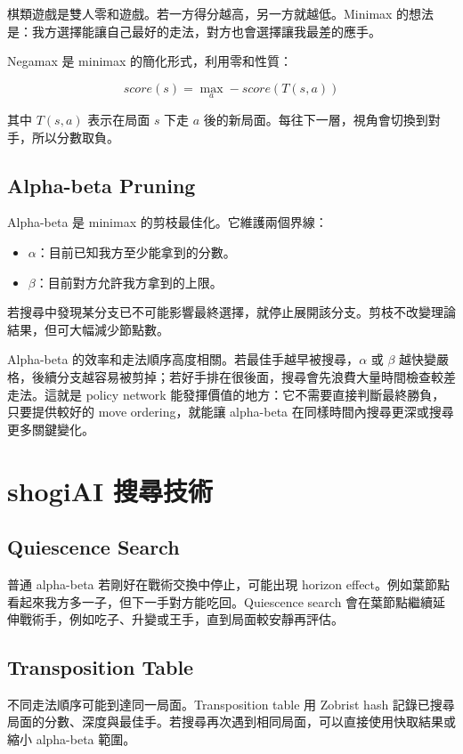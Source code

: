 \documentclass[12pt,a4paper,fontset=none]{ctexart}
\begin{document}
棋類遊戲是雙人零和遊戲。若一方得分越高，另一方就越低。Minimax 的想法是：我方選擇能讓自己最好的走法，對方也會選擇讓我最差的應手。

Negamax 是 minimax 的簡化形式，利用零和性質：

\[
score(s) = \max_a -score(T(s,a))
\]

其中 $T(s,a)$ 表示在局面 $s$ 下走 $a$ 後的新局面。每往下一層，視角會切換到對手，所以分數取負。

\subsection{Alpha-beta Pruning}

Alpha-beta 是 minimax 的剪枝最佳化。它維護兩個界線：

\begin{itemize}
  \item $\alpha$：目前已知我方至少能拿到的分數。
  \item $\beta$：目前對方允許我方拿到的上限。
\end{itemize}

若搜尋中發現某分支已不可能影響最終選擇，就停止展開該分支。剪枝不改變理論結果，但可大幅減少節點數。

Alpha-beta 的效率和走法順序高度相關。若最佳手越早被搜尋，$\alpha$ 或 $\beta$ 越快變嚴格，後續分支越容易被剪掉；若好手排在很後面，搜尋會先浪費大量時間檢查較差走法。這就是 policy network 能發揮價值的地方：它不需要直接判斷最終勝負，只要提供較好的 move ordering，就能讓 alpha-beta 在同樣時間內搜尋更深或搜尋更多關鍵變化。

\section{shogiAI 搜尋技術}

\subsection{Quiescence Search}

普通 alpha-beta 若剛好在戰術交換中停止，可能出現 horizon effect。例如葉節點看起來我方多一子，但下一手對方能吃回。Quiescence search 會在葉節點繼續延伸戰術手，例如吃子、升變或王手，直到局面較安靜再評估。

\subsection{Transposition Table}

不同走法順序可能到達同一局面。Transposition table 用 Zobrist hash 記錄已搜尋局面的分數、深度與最佳手。若搜尋再次遇到相同局面，可以直接使用快取結果或縮小 alpha-beta 範圍。
\end{document}

